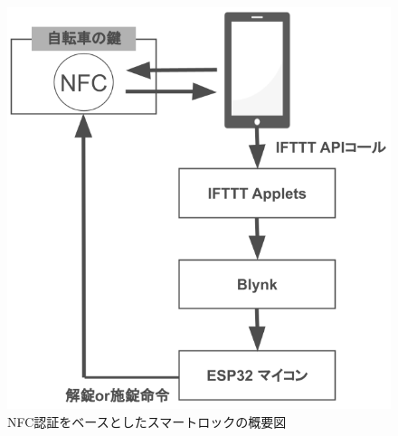           \begin{figure}[htbp]
            \centering
            \includegraphics[scale=0.36]
            {figures/overallImageOfNfcUnlock.png}
            \caption{NFC認証をベースとしたスマートロックの概要図}
            \label{fig:NFC認証をベースとしたスマートロックの概要図}
          \end{figure}
          
